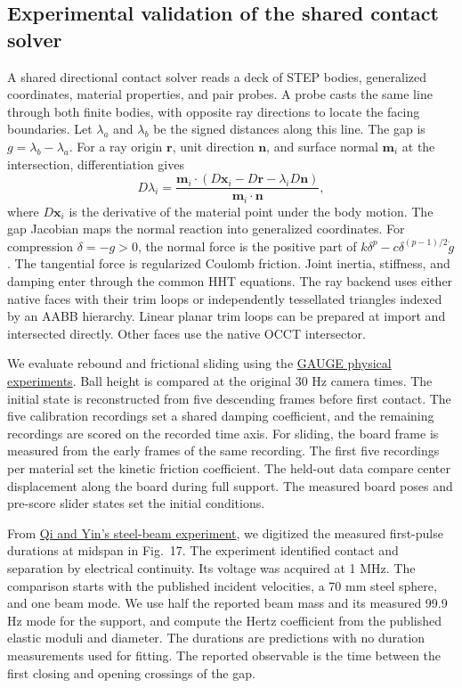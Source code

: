 \subsection{Experimental validation of the shared contact solver}
\label{sec:shared-contact-exp}

A shared directional contact solver reads a deck of STEP bodies, generalized coordinates, material properties, and pair probes. A probe casts the same line through both finite bodies, with opposite ray directions to locate the facing boundaries. Let \(\lambda_a\) and \(\lambda_b\) be the signed distances along this line. The gap is \(g=\lambda_b-\lambda_a\). For a ray origin \(\mathbf r\), unit direction \(\mathbf n\), and surface normal \(\mathbf m_i\) at the intersection, differentiation gives
\[
 D\lambda_i =
 \frac{\mathbf m_i\cdot
   \left(D\mathbf x_i-D\mathbf r-\lambda_i D\mathbf n\right)}
 {\mathbf m_i\cdot\mathbf n},
\]
where \(D\mathbf x_i\) is the derivative of the material point under the body motion. The gap Jacobian maps the normal reaction into generalized coordinates. For compression \(\delta=-g>0\), the normal force is the positive part of \(k\delta^p-c\delta^{(p-1)/2}\dot g\). The tangential force is regularized Coulomb friction. Joint inertia, stiffness, and damping enter through the common HHT equations. The ray backend uses either native faces with their trim loops or independently tessellated triangles indexed by an AABB hierarchy. Linear planar trim loops can be prepared at import and intersected directly. Other faces use the native OCCT intersector.

We evaluate rebound and frictional sliding using the \href{https://arxiv.org/abs/2608.05948}{GAUGE physical experiments}. Ball height is compared at the original 30 Hz camera times. The initial state is reconstructed from five descending frames before first contact. The five calibration recordings set a shared damping coefficient, and the remaining recordings are scored on the recorded time axis. For sliding, the board frame is measured from the early frames of the same recording. The first five recordings per material set the kinetic friction coefficient. The held-out data compare center displacement along the board during full support. The measured board poses and pre-score slider states set the initial conditions.

From \href{https://doi.org/10.1177/1687814016668089}{Qi and Yin's steel-beam experiment}, we digitized the measured first-pulse durations at midspan in Fig.~17. The experiment identified contact and separation by electrical continuity. Its voltage was acquired at 1 MHz. The comparison starts with the published incident velocities, a 70 mm steel sphere, and one beam mode. We use half the reported beam mass and its measured 99.9 Hz mode for the support, and compute the Hertz coefficient from the published elastic moduli and diameter. The \ContactBeamCount{} durations are predictions with no duration measurements used for fitting. The reported observable is the time between the first closing and opening crossings of the gap.

